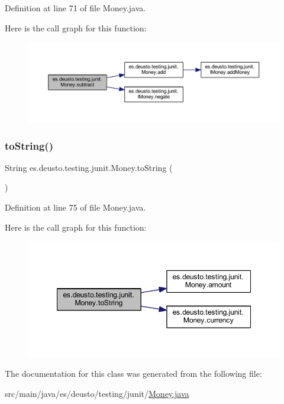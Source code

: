 Definition at line 71 of file Money.\+java.

Here is the call graph for this function\+:
\nopagebreak
\begin{figure}[H]
\begin{center}
\leavevmode
\includegraphics[width=350pt]{classes_1_1deusto_1_1testing_1_1junit_1_1_money_aada973cd1a31410ed2b7e5d2ae6bc2e9_cgraph}
\end{center}
\end{figure}
\mbox{\label{classes_1_1deusto_1_1testing_1_1junit_1_1_money_af9e655069123757bea0efecc4efcd638}} 
\subsubsection{\texorpdfstring{to\+String()}{toString()}}
{\footnotesize\ttfamily String es.\+deusto.\+testing.\+junit.\+Money.\+to\+String (\begin{DoxyParamCaption}{ }\end{DoxyParamCaption})}



Definition at line 75 of file Money.\+java.

Here is the call graph for this function\+:
\nopagebreak
\begin{figure}[H]
\begin{center}
\leavevmode
\includegraphics[width=348pt]{classes_1_1deusto_1_1testing_1_1junit_1_1_money_af9e655069123757bea0efecc4efcd638_cgraph}
\end{center}
\end{figure}


The documentation for this class was generated from the following file\+:\begin{DoxyCompactItemize}
\item 
src/main/java/es/deusto/testing/junit/\mbox{\hyperlink{_money_8java}{Money.\+java}}\end{DoxyCompactItemize}

